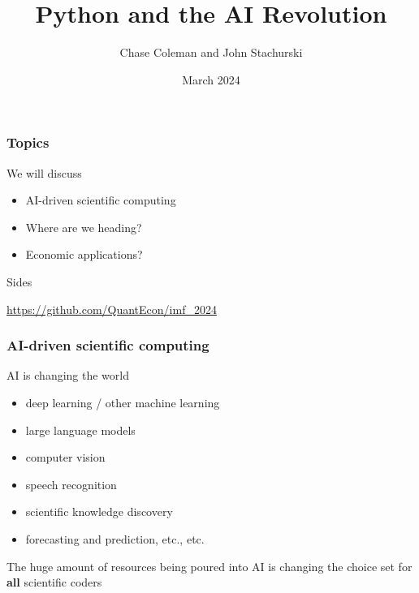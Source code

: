 \documentclass[
    xcolor={svgnames,dvipsnames},
    hyperref={colorlinks, citecolor=DeepPink4, linkcolor=DarkRed, urlcolor=DarkBlue}
    ]{beamer}  %
\title{Python and the AI Revolution}
\author{Chase Coleman and John Stachurski}
\date{March 2024}
\newcommand{\emp}[1]{\textcolor{DarkOrange1}{\bf #1}}
\newcommand{\1}{\mathbbm 1}
\begin{document}
\begin{frame}
  \titlepage
\end{frame}







\begin{frame}
    \frametitle{Topics}

    We will discuss

    \begin{itemize}
        \item AI-driven scientific computing
        \vspace{0.5em}
        \item Where are we heading?
        \vspace{0.5em}
        \item Economic applications?
    \end{itemize}

        \vspace{0.5em}
        \vspace{0.5em}
    Sides

    \url{https://github.com/QuantEcon/imf_2024}

\end{frame}



\begin{frame}
    \frametitle{AI-driven scientific computing}

    AI is changing the world

    \begin{itemize}
        \item deep learning / other machine learning
        \item large language models
        \item computer vision
        \item speech recognition
        \item scientific knowledge discovery
        \item forecasting and prediction, etc., etc.
    \end{itemize}

        \vspace{0.5em}
        \vspace{0.5em}
    The huge amount of resources being poured into AI is changing the choice set
    for \emp{all} scientific coders
    
\end{frame}
\end{document}
